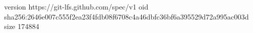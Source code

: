 version https://git-lfs.github.com/spec/v1
oid sha256:2646e007c555f2ea23f4fdb08f6708c4a46dbfc36bf6a395529d72a995ac003d
size 174884
